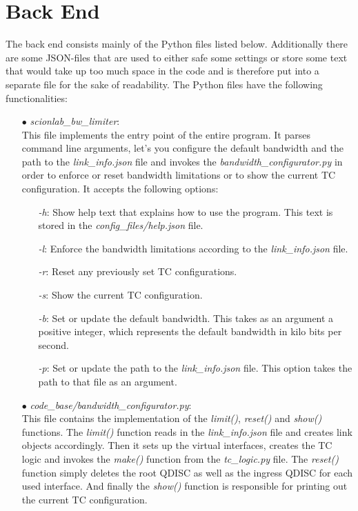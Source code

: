 \section{Back End}

The back end consists mainly of the Python files listed below. Additionally there are some \acs{JSON}-files that are used to either safe some settings or store some text that would take up too much space in the code and is therefore put into a separate file for the sake of readability. The Python files have the following functionalities:

\begin{enumerate}
\item[$\bullet$]\textit{scionlab\_bw\_limiter}:
\\
This file implements the entry point of the entire program. It parses command line arguments, let's you configure the default bandwidth and the path to the \textit{link\_info.json} file and invokes the \textit{bandwidth\_configurator.py} in order to enforce or reset bandwidth limitations or to show the current \acs{TC} configuration. It accepts the following options:
	\begin{enumerate}
	\item[\textit{-h}:] Show help text that explains how to use the program. This text is stored in the \textit{config\_files/help.json} file.
	\item[\textit{-l}:] Enforce the bandwidth limitations according to the \textit{link\_info.json} file.
	\item[\textit{-r}:] Reset any previously set \acs{TC} configurations.
	\item[\textit{-s}:] Show the current \acs{TC} configuration.
	\item[\textit{-b}:] Set or update the default bandwidth. This takes as an argument a positive integer, which represents the default bandwidth in kilo bits per second.
	\item[\textit{-p}:] Set or update the path to the \textit{link\_info.json} file. This option takes the path to that file as an argument.
	\end{enumerate}

\item[$\bullet$]\textit{code\_base/bandwidth\_configurator.py}:
\\
This file contains the implementation of the \textit{limit()}, \textit{reset()} and \textit{show()} functions. The \textit{limit()} function reads in the \textit{link\_info.json} file and creates link objects accordingly. Then it sets up the virtual interfaces, creates the \acs{TC} logic and invokes the \textit{make()} function from the \textit{tc\_logic.py} file. The \textit{reset()} function simply deletes the root \acs{QDISC} as well as the ingress \acs{QDISC} for each used interface. And finally the \textit{show()} function is responsible for printing out the current \acs{TC} configuration.


\end{enumerate}
